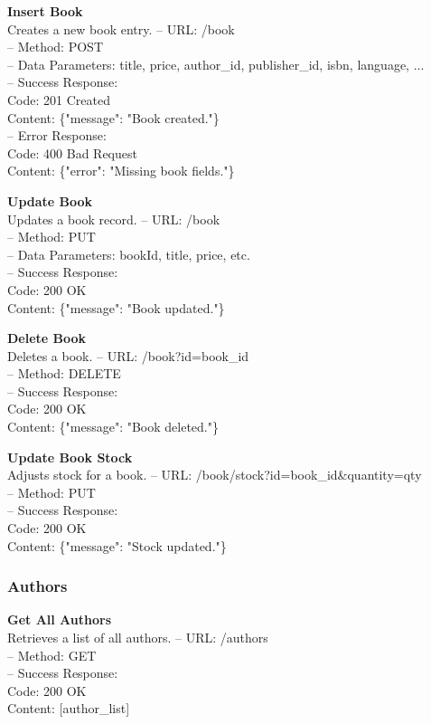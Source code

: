 \textbf{Insert Book} \\
Creates a new book entry.
– URL: /book \\
– Method: POST \\
– Data Parameters: title, price, author_id, publisher_id, isbn, language, ... \\
– Success Response: \\
Code: 201 Created \\
Content: \{"message": "Book created."\} \\
– Error Response: \\
Code: 400 Bad Request \\
Content: \{"error": "Missing book fields."\}

\textbf{Update Book} \\
Updates a book record.
– URL: /book \\
– Method: PUT \\
– Data Parameters: bookId, title, price, etc. \\
– Success Response: \\
Code: 200 OK \\
Content: \{"message": "Book updated."\}

\textbf{Delete Book} \\
Deletes a book.
– URL: /book?id={book_id} \\
– Method: DELETE \\
– Success Response: \\
Code: 200 OK \\
Content: \{"message": "Book deleted."\}

\textbf{Update Book Stock} \\
Adjusts stock for a book.
– URL: /book/stock?id={book_id}&quantity={qty} \\
– Method: PUT \\
– Success Response: \\
Code: 200 OK \\
Content: \{"message": "Stock updated."\}

\subsubsection*{Authors}

\textbf{Get All Authors} \\
Retrieves a list of all authors.
– URL: /authors \\
– Method: GET \\
– Success Response: \\
Code: 200 OK \\
Content: [author_list]

